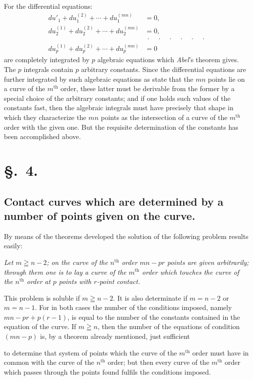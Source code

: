 \documentclass{article}
\begin{document}
For the differential equations:
\[
\begin{aligned}
du'_{1} + du_{1}^{(2)} + \cdots + du_{1}^{(mn)} &= 0, \\
du_{2}^{(1)} + du_{2}^{(2)} + \cdots + du_{2}^{(mn)} &= 0, \\
&\ \cdot\quad\cdot\quad\cdot\quad\cdot\quad\cdot\quad\cdot \\
du_{p}^{(1)} + du_{p}^{(2)} + \cdots + du_{p}^{(mn)} &= 0
\end{aligned}
\]
are completely integrated by $p$ algebraic equations which \emph{Abel}'s theorem gives. The $p$ integrals contain $p$ arbitrary constants. Since the differential equations are further integrated by such algebraic equations as state that the $mn$ points lie on a curve of the $m^{\text{th}}$ order, these latter must be derivable from the former by a special choice of the arbitrary constants; and if one holds such values of the constants fast, then the algebraic integrals must have precisely that shape in which they characterize the $mn$ points as the intersection of a curve of the $m^{\text{th}}$ order with the given one. But the requisite determination of the constants has been accomplished above.

\section*{§.~4.}
\subsection*{Contact curves which are determined by a number of points given on the curve.}

By means of the theorems developed the solution of the following problem results easily:

\emph{Let $m \geqq n-2$; on the curve of the $n^{\text{th}}$ order $mn-pr$ points are given arbitrarily; through them one is to lay a curve of the $m^{\text{th}}$ order which touches the curve of the $n^{\text{th}}$ order at $p$ points with $r$-point contact.}

This problem is soluble if $m \geqq n-2$. It is also determinate if $m = n-2$ or $m = n-1$. For in both cases the number of the conditions imposed, namely $mn - pr + p(r-1)$, is equal to the number of the constants contained in the equation of the curve. If $m \geqq n$, then the number of the equations of condition $(mn - p)$ is, by a theorem already mentioned, just sufficient

to determine that system of points which the curve of the $m^{\text{th}}$ order must have in common with the curve of the $n^{\text{th}}$ order; but then every curve of the $m^{\text{th}}$ order which passes through the points found fulfils the conditions imposed.
\end{document}
